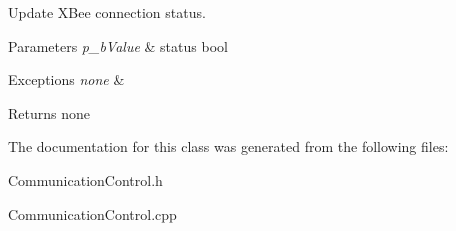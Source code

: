 Update X\-Bee connection status. 


\begin{DoxyParams}{Parameters}
{\em p\-\_\-b\-Value} & status bool \\
\hline
\end{DoxyParams}

\begin{DoxyExceptions}{Exceptions}
{\em none} & \\
\hline
\end{DoxyExceptions}
\begin{DoxyReturn}{Returns}
none 
\end{DoxyReturn}


The documentation for this class was generated from the following files\-:\begin{DoxyCompactItemize}
\item 
Communication\-Control.\-h\item 
Communication\-Control.\-cpp\end{DoxyCompactItemize}
